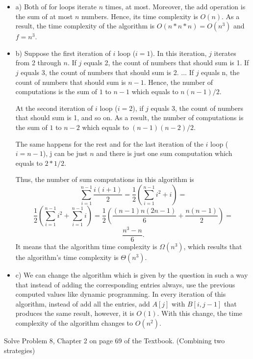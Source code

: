 \documentclass[11pt]{article}
\newenvironment{solution}[2][Solution]{\begin{trivlist}
\item[\hskip \labelsep {\bfseries #1}]}{\end{trivlist}}
\newenvironment{problem}[2][Problem]{\begin{trivlist}
\item[\hskip \labelsep {\bfseries #1}\hskip \labelsep {\bfseries #2.}]}{\end{trivlist}}
\begin{document}
\begin{solution}{}
\begin{itemize}
\item a) Both of for loops iterate $n$ times, at most. Moreover, the add operation is
the sum of at most $n$ numbers. Hence, its time complexity is $O(n)$.
As a result, the time complexity of the algorithm is $O(n*n*n) = O(n^3)$ and $f=n^3$.

\item b) Suppose the first iteration of $i$ loop ($i=1$). In this iteration,
$j$ iterates from 2 through $n$. If $j$ equals 2, the count of numbers that should sum is 1.
If $j$ equals 3, the count of numbers that should sum is 2. ... 
If $j$ equals n, the count of numbers that should sum is $n-1$. Hence, the number of computations
is the sum of $1$ to $n-1$ which equals to $n(n-1)/2$.

At the second iteration of $i$ loop ($i=2$), if $j$ equals 3, the count of numbers that
should sum is 1, and so on. As a result, the number of computations is the sum of $1$ to $n-2$
which equals to $(n-1)(n-2)/2$.

The same happens for the rest and for the last iteration of the $i$ loop ($i=n-1$), j 
can be just $n$ and there is just one sum computation which equals to $2*1/2$.

Thus, the number of sum computations in this algorithm is
$$\sum_{i=1}^{n-1} \frac{i(i+1)}{2} = \frac{1}{2}(\sum_{i=1}^{n-1} i^2 + i)=$$
$$\frac{1}{2} (\sum_{i=1}^{n-1} i^2 + \sum_{i=1}^{n-1} i) = \frac{1}{2} (\frac{(n-1)n(2n-1)}{6} + \frac{n(n-1)}{2})=$$
$$ \frac{n^3-n}{6}. $$
It means that the algorithm time complexity is $\Omega(n^3)$, which results that the
algorithm's time complexity is $\Theta(n^3)$.

\item c) We can change the algorithm which is given by the question in such a way that
instead of adding the corresponding entries always, use the previous computed values
like dynamic programming. In every iteration of this algorithm, instead of add all the
entries, add $A[j]$ with $B[i,j-1]$ that produces the same result, however, it is $O(1)$.
With this change, the time complexity of the algorithm changes to $O(n^2)$.
\end{itemize}
\end{solution}


\begin{problem}{2}
Solve Problem 8, Chapter 2 on page 69 of the Textbook. (Combining two strategies)
\end{problem}
\end{document}
